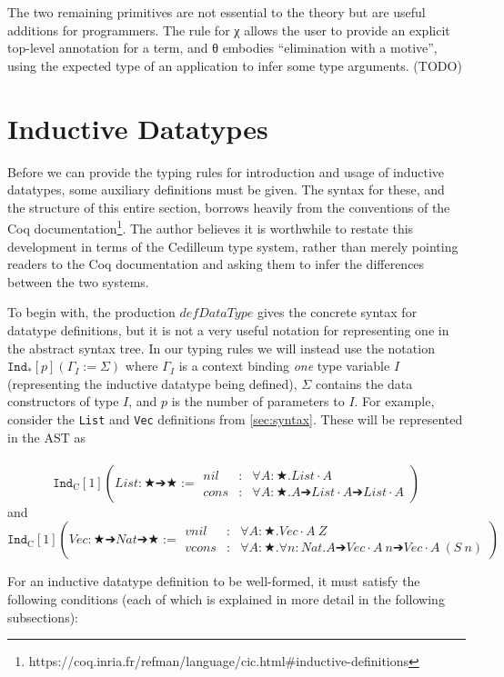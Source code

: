 \documentclass{article}
\newcommand{\indast}[4]{\texttt{Ind}_{\text{#1}} [#2] (#3 := #4)}
\begin{document}
The two remaining primitives are not essential to the theory but are useful
additions for programmers. The rule for χ allows the user to provide an
explicit top-level annotation for a term, and θ embodies ``elimination with a
motive'', using the expected type of an application to infer some type
arguments. (TODO)

\section{Inductive Datatypes}

Before we can provide the typing rules for introduction and usage of inductive
datatypes, some auxiliary definitions must be given. The syntax for these, and
the structure of this entire section, borrows heavily from the conventions of the Coq
documentation\footnote{https://coq.inria.fr/refman/language/cic.html\#inductive-definitions}.
The author believes it is worthwhile to restate this development in terms of the
Cedilleum type system, rather than merely pointing readers to the Coq
documentation and asking them to infer the differences between the two systems.

To begin with, the production $defDataType$ gives the concrete syntax for datatype definitions,
but it is not a very useful notation for representing one in the abstract syntax
tree. In our typing rules we will instead use the notation
$\indast{*}{p}{\Gamma_I}{\Sigma}$ where $\Gamma_I$ is a context binding
\textit{one} type variable $I$ (representing the inductive datatype being defined),
$\Sigma$ contains the data constructors of type $I$, and $p$ is the number
of parameters to $I$. For example, consider the \texttt{List} and \texttt{Vec} definitions from
\ref{sec:syntax}. These will be represented in the AST as
\\ \\
\[\indast{C}{1}{List : ★ ➔ ★}
{\begin{array}{lcl}
   nil & : & ∀ A : ★ . List \cdot A
   \\ cons & : & ∀ A : ★ . A ➔ List \cdot A ➔ List \cdot A
 \end{array}
}\] and
\\
\[\indast{C}{1}{Vec : ★ ➔ Nat ➔ ★}
{\begin{array}{lcl}
   vnil & : & ∀ A : ★ . Vec \cdot A\ Z
   \\ vcons & : & ∀ A : ★ . ∀ n : Nat . A ➔ Vec \cdot A\ n ➔ Vec \cdot A\ (S\ n)
 \end{array}
}\]

For an inductive datatype definition to be well-formed, it must satisfy the
following conditions (each of which is explained in more detail in the following
subsections):
\end{document}
